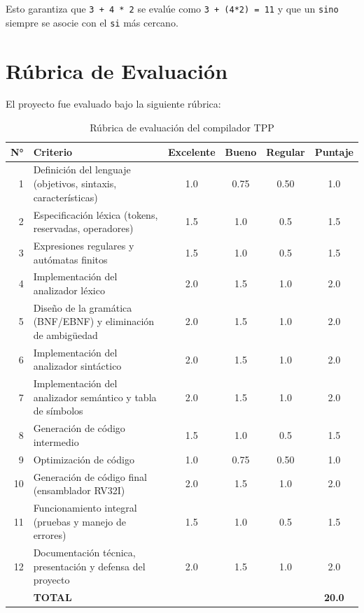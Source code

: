 Esto garantiza que \texttt{3 + 4 * 2} se evalúe como \texttt{3 + (4*2) = 11} y que un \texttt{sino} siempre se asocie con el \texttt{si} más cercano.

\section{Rúbrica de Evaluación}

El proyecto fue evaluado bajo la siguiente rúbrica:

\begin{table}[H]
\centering
\small
\begin{tabular}{rp{7.5cm}cccc}
\toprule
\textbf{N°} & \textbf{Criterio} & \textbf{Excelente} & \textbf{Bueno} & \textbf{Regular} & \textbf{Puntaje} \\
\midrule
1  & Definición del lenguaje (objetivos, sintaxis, características) & 1.0 & 0.75 & 0.50 & 1.0 \\
2  & Especificación léxica (tokens, reservadas, operadores)         & 1.5 & 1.0  & 0.5  & 1.5 \\
3  & Expresiones regulares y autómatas finitos                      & 1.5 & 1.0  & 0.5  & 1.5 \\
4  & Implementación del analizador léxico                           & 2.0 & 1.5  & 1.0  & 2.0 \\
5  & Diseño de la gramática (BNF/EBNF) y eliminación de ambigüedad & 2.0 & 1.5  & 1.0  & 2.0 \\
6  & Implementación del analizador sintáctico                       & 2.0 & 1.5  & 1.0  & 2.0 \\
7  & Implementación del analizador semántico y tabla de símbolos    & 2.0 & 1.5  & 1.0  & 2.0 \\
8  & Generación de código intermedio                                & 1.5 & 1.0  & 0.5  & 1.5 \\
9  & Optimización de código                                         & 1.0 & 0.75 & 0.50 & 1.0 \\
10 & Generación de código final (ensamblador RV32I)                 & 2.0 & 1.5  & 1.0  & 2.0 \\
11 & Funcionamiento integral (pruebas y manejo de errores)          & 1.5 & 1.0  & 0.5  & 1.5 \\
12 & Documentación técnica, presentación y defensa del proyecto     & 2.0 & 1.5  & 1.0  & 2.0 \\
\midrule
   & \textbf{TOTAL} & & & & \textbf{20.0} \\
\bottomrule
\end{tabular}
\caption{Rúbrica de evaluación del compilador TPP}
\label{tab:rubrica}
\end{table}

